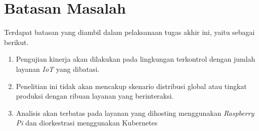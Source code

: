 \section{Batasan Masalah}
\label{sec:batasan-masalah}

Terdapat batasan yang diambil dalam pelaksanaan tugas akhir ini, yaitu sebagai berikut.

\begin{enumerate}
    \item Pengujian kinerja akan dilakukan pada lingkungan terkontrol dengan jumlah layanan \textit{IoT} yang dibatasi. 
    \item Penelitian ini tidak akan mencakup skenario distribusi global atau tingkat produksi dengan ribuan layanan yang berinteraksi.
    \item Analisis akan terbatas pada layanan yang dihosting menggunakan \textit{Raspberry Pi} dan diorkestrasi menggunakan Kubernetes
 \end{enumerate}

